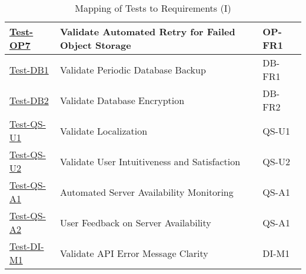 \documentclass[12pt, titlepage]{article}
\begin{document}
\begin{table}[htpb!]
\begin{tabular}{|l|p{8cm}|p{3cm}|}
        \hline
        \hyperref[itm:Test-OP7]{Test-OP7} & Validate Automated Retry for Failed Object Storage & OP-FR1 \\
        \hline
        \hyperref[itm:Test-DB1]{Test-DB1} & Validate Periodic Database Backup & DB-FR1 \\
        \hline
        \hyperref[itm:Test-DB2]{Test-DB2} & Validate Database Encryption & DB-FR2 \\
        \hline
        \hyperref[itm:Test-QS-U1]{Test-QS-U1} & Validate Localization & QS-U1 \\
        \hline
        \hyperref[itm:Test-QS-U2]{Test-QS-U2} & Validate User Intuitiveness and Satisfaction & QS-U2 \\
        \hline
        \hyperref[itm:Test-QS-A1]{Test-QS-A1} & Automated Server Availability Monitoring & QS-A1 \\
        \hline
        \hyperref[itm:Test-QS-A2]{Test-QS-A2} & User Feedback on Server Availability & QS-A1 \\
        \hline
        \hyperref[itm:Test-DI-M1]{Test-DI-M1} & Validate API Error Message Clarity & DI-M1 \\
        \hline
    \end{tabular}
    \caption{Mapping of Tests to Requirements (I)}
    \label{tab:test_requirements1}
\end{table}
\end{document}
